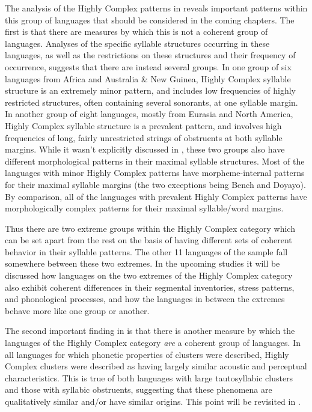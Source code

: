  The analysis of the Highly Complex patterns in  reveals important patterns within this group of languages that should be considered in the coming chapters. The first is that there are measures by which this is not a coherent group of languages. Analyses of the specific syllable structures occurring in these languages, as well as the restrictions on these structures and their frequency of occurrence, suggests that there are instead several groups. In one group of six languages from Africa and Australia \& New Guinea, Highly Complex syllable structure is an extremely minor pattern, and includes low frequencies of highly restricted structures, often containing several sonorants, at one syllable margin. In another group of eight languages, mostly from Eurasia and North America, Highly Complex syllable structure is a prevalent pattern, and involves high frequencies of long, fairly unrestricted strings of obstruents at both syllable margins. While it wasn’t explicitly discussed in , these two groups also have different morphological patterns in their maximal syllable structures. Most of the languages with minor Highly Complex patterns have morpheme-internal patterns for their maximal syllable margins (the two exceptions being Bench and Doyayo). By comparison, all of the languages with prevalent Highly Complex patterns have morphologically complex patterns for their maximal syllable/word margins.

  Thus there are two extreme groups within the Highly Complex category which can be set apart from the rest on the basis of having different sets of coherent behavior in their syllable patterns. The other 11 languages of the sample fall somewhere between these two extremes. In the upcoming studies it will be discussed how languages on the two extremes of the Highly Complex category also exhibit coherent differences in their segmental inventories, stress patterns, and phonological processes, and how the languages in between the extremes behave more like one group or another.

  The second important finding in  is that there is another measure by which the languages of the Highly Complex category \textit{are} a coherent group of languages. In all languages for which phonetic properties of clusters were described, Highly Complex clusters were described as having largely similar acoustic and perceptual characteristics. This is true of both languages with large tautosyllabic clusters and those with syllabic obstruents, suggesting that these phenomena are qualitatively similar and/or have similar origins. This point will be revisited in .


